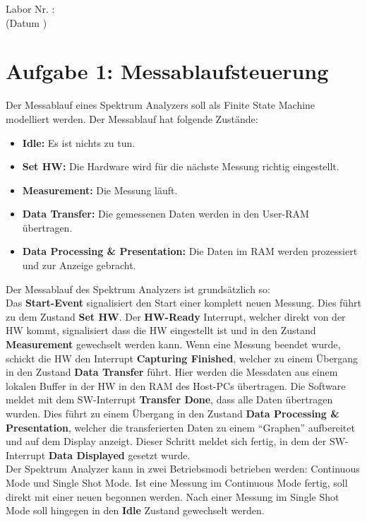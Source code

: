 \documentclass[a4paper]{scrartcl}
\def\header#1#2{
  \begin{center}
    {\Large Labor #1: \TOPIC}\\
    {(Datum #2)}
  \end{center}
}
\begin{document}
\header{Nr. \NUMBER}{\DATE}

\section*{Aufgabe 1: Messablaufsteuerung}
Der Messablauf eines Spektrum Analyzers soll als Finite State Machine modelliert werden.
Der Messablauf hat folgende Zustände:
\begin{itemize}
  \item \textbf{Idle:} Es ist nichts zu tun.
  \item \textbf{Set HW:} Die Hardware wird für die nächste Messung richtig eingestellt.
  \item \textbf{Measurement:} Die Messung läuft.
  \item \textbf{Data Transfer:} Die gemessenen Daten werden in den User-RAM übertragen. 
  \item \textbf{Data Processing \& Presentation:} Die Daten im RAM werden prozessiert und zur Anzeige gebracht.  
\end{itemize}

Der Messablauf des Spektrum Analyzers ist grundsätzlich so:\\
Das \textbf{Start-Event} signalisiert den Start einer komplett neuen Messung. Dies führt zu dem Zustand \textbf{Set HW}. Der  \textbf{HW-Ready} Interrupt,
welcher direkt von der HW kommt, signalisiert dass die HW eingestellt ist und in den Zustand   \textbf{Measurement} gewechselt werden kann.
Wenn eine Messung beendet wurde, schickt die HW den Interrupt \textbf{Capturing Finished}, welcher zu einem Übergang in den Zustand \textbf{Data Transfer} führt.
Hier werden die Messdaten aus einem lokalen Buffer in der HW in den RAM des Host-PCs übertragen. Die Software meldet mit dem SW-Interrupt \textbf{Transfer Done},
dass 
alle Daten übertragen wurden. Dies führt zu einem Übergang in den Zustand \textbf{Data Processing \& Presentation}, welcher die transferierten
Daten zu einem ``Graphen'' aufbereitet und auf dem Display anzeigt. Dieser Schritt meldet sich fertig, in dem der SW-Interrupt \textbf{Data Displayed} 
gesetzt wurde.\\

Der Spektrum Analyzer kann in zwei Betriebsmodi betrieben werden: Continuous Mode und Single Shot Mode. Ist eine Messung im Continuous Mode fertig, soll
direkt mit einer neuen begonnen werden. Nach einer Messung im Single Shot Mode soll hingegen in den \textbf{Idle} Zustand gewechselt werden.\\
\end{document}
